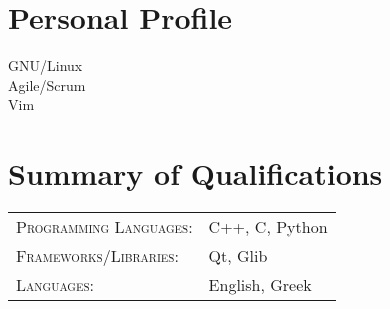 \documentclass[alan.tex]{subfiles}
\begin{document}
  \section{Personal Profile}
    GNU/Linux \\
    Agile/Scrum \\
    Vim
  \section{Summary of Qualifications}
  \begin{tabular}{ll}
    \textsc{Programming Languages}:  & C++, C, Python\\[1pt]
    \textsc{Frameworks/Libraries}: & Qt, Glib\\[1pt]
    \textsc{Languages}: & English, Greek
  \end{tabular}
\end{document}
